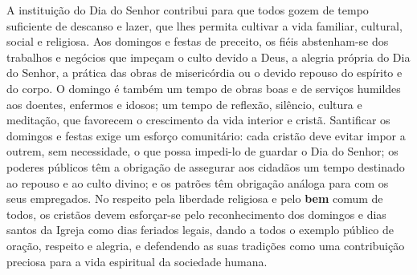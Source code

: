 A instituição do Dia do Senhor contribui para que todos gozem de tempo suficiente de descanso e lazer, que lhes permita cultivar a vida familiar, cultural, social e religiosa. Aos domingos e festas de preceito, os fiéis abstenham-se dos trabalhos e negócios que impeçam o culto devido a Deus, a alegria própria do Dia do Senhor, a prática das obras de misericórdia ou o devido repouso do espírito e do corpo. O domingo é também um tempo de obras boas e de serviços humildes aos doentes, enfermos e idosos; um tempo de reflexão, silêncio, cultura e meditação, que favorecem o crescimento da vida interior e cristã. Santificar os domingos e festas exige um esforço comunitário: cada cristão deve evitar impor a outrem, sem necessidade, o que possa impedi-lo de guardar o Dia do Senhor; os poderes públicos têm a obrigação de assegurar aos cidadãos um tempo destinado ao repouso e ao culto divino; e os patrões têm obrigação análoga para com os seus empregados. No respeito pela liberdade religiosa e pelo \textbf{bem} comum de todos, os cristãos devem esforçar-se pelo reconhecimento dos domingos e dias santos da Igreja como dias feriados legais, dando a todos o exemplo público de oração, respeito e alegria, e defendendo as suas tradições como uma contribuição preciosa para a vida espiritual da sociedade humana.
